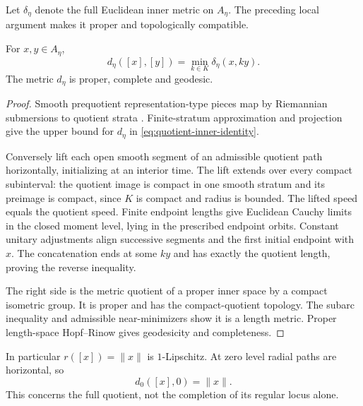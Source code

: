 Let $\delta_\eta$ denote the full Euclidean inner metric on $A_\eta$.
The preceding local argument makes it proper and topologically
compatible.
\begin{lemma}\label{lem:quotient-inner-identity}
For $x,y\in A_\eta$,
\begin{equation}\label{eq:quotient-inner-identity}
 d_\eta([x],[y])=\min_{k\in K}\delta_\eta(x,ky).
\end{equation}
The metric $d_\eta$ is proper, complete and geodesic.
\end{lemma}
\begin{proof}
Smooth prequotient representation-type pieces map by Riemannian
submersions to quotient strata
\cite[Theorem~1.1(i), \S2.5]{May22}.
Finite-stratum approximation and projection give the upper bound
for $d_\eta$ in \eqref{eq:quotient-inner-identity}.

Conversely lift each open smooth segment of an admissible quotient
path horizontally, initializing at an interior time.
The lift extends over every compact subinterval: the quotient image
is compact in one smooth stratum and its preimage is compact,
since $K$ is compact and radius is bounded.
The lifted speed equals the quotient speed. Finite endpoint lengths
give Euclidean Cauchy limits in the closed moment level, lying in
the prescribed endpoint orbits. Constant unitary adjustments align
successive segments and the first initial endpoint with $x$.
The concatenation ends at some $ky$ and has exactly the quotient
length, proving the reverse inequality.

The right side is the metric quotient of a proper inner space by
a compact isometric group. It is proper and has the compact-quotient
topology. The subarc inequality and admissible near-minimizers show
it is a length metric. Proper length-space Hopf--Rinow gives
geodesicity and completeness.
\end{proof}
In particular $r([x])=\|x\|$ is $1$-Lipschitz.
At zero level radial paths are horizontal, so
\begin{equation}\label{eq:cone-radius}
 d_0([x],0)=\|x\|.
\end{equation}
This concerns the full quotient, not the completion of its regular
locus alone.


